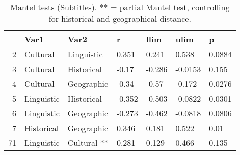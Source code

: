 \begin{table}[ht]
\centering
\begin{tabular}{rllllll}
  \hline
 & Var1 & Var2 & r & llim & ulim & p \\ 
  \hline
2 & Cultural & Linguistic & 0.351 & 0.241 & 0.538 & 0.0884 \\ 
  3 & Cultural & Historical & -0.17 & -0.286 & -0.0153 & 0.155 \\ 
  4 & Cultural & Geographic & -0.34 & -0.57 & -0.172 & 0.0276 \\ 
  5 & Linguistic & Historical & -0.352 & -0.503 & -0.0822 & 0.0301 \\ 
  6 & Linguistic & Geographic & -0.273 & -0.462 & -0.0818 & 0.0806 \\ 
  7 & Historical & Geographic & 0.346 & 0.181 & 0.522 & 0.01 \\ 
  71 & Linguistic & Cultural ** & 0.281 & 0.129 & 0.466 & 0.135 \\ 
   \hline
\end{tabular}
\caption{Mantel tests (Subtitles). ** = partial Mantel test, controlling for historical and geographical distance.} 
\end{table}
